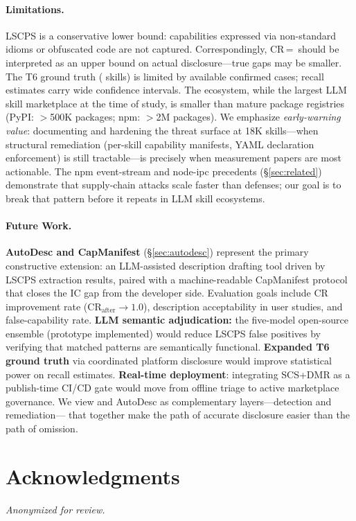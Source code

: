 \paragraph{Limitations.}
LSCPS is a conservative lower bound: capabilities expressed via
non-standard idioms or obfuscated code are not captured.
Correspondingly, CR\,=\,\ResultCR{} should be interpreted as an
upper bound on actual disclosure---true gaps may be smaller.
The T6 ground truth (\Nmalicious{} skills) is limited by available
confirmed cases; recall estimates carry wide confidence intervals.
The \clawhub{} ecosystem, while the largest LLM skill marketplace
at the time of study, is smaller than mature package registries
(PyPI: $>$500K packages; npm: $>$2M packages).
We emphasize \emph{early-warning value}: documenting and hardening
the threat surface at 18K skills---when structural remediation
(per-skill capability manifests, YAML declaration enforcement)
is still tractable---is precisely when measurement papers are most actionable.
The npm event-stream and node-ipc precedents (\S\ref{sec:related})
demonstrate that supply-chain attacks scale faster than defenses;
our goal is to break that pattern before it repeats in LLM skill ecosystems.

\paragraph{Future Work.}
\textbf{AutoDesc and CapManifest} (§\ref{sec:autodesc}) represent the
primary constructive extension: an LLM-assisted description drafting tool
driven by LSCPS extraction results, paired with a machine-readable
CapManifest protocol that closes the IC gap from the developer side.
Evaluation goals include CR improvement rate ($\text{CR}_{\text{after}} \to 1.0$),
description acceptability in user studies, and false-capability rate.
\textbf{LLM semantic adjudication:} the five-model open-source ensemble
(prototype implemented) would reduce LSCPS false positives by verifying
that matched patterns are semantically functional.
\textbf{Expanded T6 ground truth} via coordinated platform disclosure
would improve statistical power on recall estimates.
\textbf{Real-time deployment}: integrating SCS+DMR as a publish-time
CI/CD gate would move \sysname from offline triage to active marketplace governance.
We view \sysname and AutoDesc as complementary layers---detection and remediation---
that together make the path of accurate disclosure easier than the path of omission.

\section*{Acknowledgments}

\textit{Anonymized for review.}

